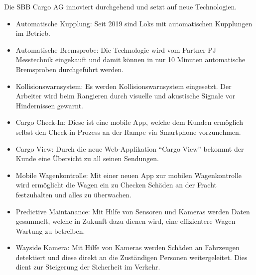 \documentclass{article}
\begin{document}
Die SBB Cargo AG innoviert durchgehend und setzt auf neue Technologien.
\begin{itemize}
    \item Automatische Kupplung: Seit 2019 sind Loks mit automatischen Kupplungen im Betrieb.
    \item Automatische Bremsprobe: Die Technologie wird vom Partner PJ Messtechnik eingekauft und damit können in nur 10 Minuten automatische Bremsproben durchgeführt werden.
    \item Kollisionswarnsystem: Es werden Kollisionswarnsystem eingesetzt. Der Arbeiter wird beim Rangieren durch visuelle und akustische Signale vor Hindernissen gewarnt.
    \item Cargo Check-In: Diese ist eine mobile App, welche dem Kunden ermöglich selbst den Check-in-Prozess an der Rampe via Smartphone vorzunehmen.
    \item Cargo View: Durch die neue Web-Applikation “Cargo View” bekommt der Kunde eine Übersicht zu all seinen Sendungen.
    \item Mobile Wagenkontrolle: Mit einer neuen App zur mobilen Wagenkontrolle wird ermöglicht die Wagen ein zu Checken Schäden an der Fracht festzuhalten und alles zu überwachen.
    \item Predictive Maintanance: Mit Hilfe von Sensoren und Kameras werden Daten gesammelt, welche in Zukunft dazu dienen wird, eine effizientere Wagen Wartung zu betreiben.
    \item Wayside Kamera: Mit Hilfe von Kameras werden Schäden an Fahrzeugen detektiert und diese direkt an die Zuständigen Personen weitergeleitet. Dies dient zur Steigerung der Sicherheit im Verkehr.
\end{itemize}
\parencite[o. S.]{innovation}
\end{document}
